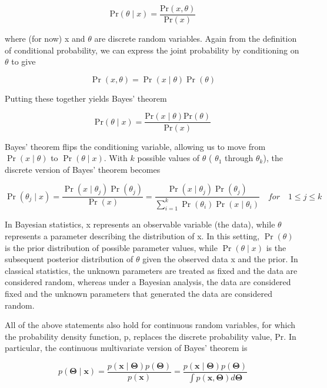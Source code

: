 \documentclass{article}
\begin{document}
\begin{equation}
\mathrm{Pr}(\theta\mid x)=\frac{\mathrm{Pr}(x,\theta)}{\mathrm{Pr}(x)}
\end{equation}

where (for now) x and  $ \theta $ are discrete random variables. Again from the definition of conditional probability, we can express the joint probability by conditioning on  $ \theta $ to give

\begin{equation}
\Pr(x,\theta)=\Pr(x\mid\theta)\Pr(\theta)
\end{equation}

Putting these together yields Bayes' theorem

\begin{equation}
\mathrm{Pr}(\theta\mid x)=\frac{\mathrm{Pr}(x\mid\theta)\mathrm{Pr}(\theta)}{\mathrm{Pr}(x)}
\end{equation}

Bayes' theorem flips the conditioning variable, allowing us to move from  $ \Pr(x \mid \theta) $ to  $ \Pr(\theta \mid x) $. With  $ k $ possible values of  $ \theta $ ( $ \theta_1 $ through  $ \theta_k $), the discrete version of Bayes' theorem becomes

\begin{equation}
\Pr(\theta_{j}\mid x)=\frac{\Pr(x\mid\theta_{j})\Pr(\theta_{j})}{\Pr(x)}=\frac{\Pr(x\mid\theta_{j})\Pr(\theta_{j})}{\displaystyle\sum_{i=1}^{k}\Pr(\theta_{i})\Pr(x\mid\theta_{i})}\quad for\quad1\leq j\leq k
\end{equation}

In Bayesian statistics, x represents an observable variable (the data), while  $ \theta $ represents a parameter describing the distribution of x. In this setting,  $ \Pr(\theta) $ is the prior distribution of possible parameter values, while  $ \Pr(\theta \mid x) $ is the subsequent posterior distribution of  $ \theta $ given the observed data x and the prior. In classical statistics, the unknown parameters are treated as fixed and the data are considered random, whereas under a Bayesian analysis, the data are considered fixed and the unknown parameters that generated the data are considered random.

All of the above statements also hold for continuous random variables, for which the probability density function, p, replaces the discrete probability value, Pr. In particular, the continuous multivariate version of Bayes' theorem is

\begin{equation}
p(\boldsymbol{\Theta}\mid\mathbf{x})=\frac{p(\mathbf{x}\mid\boldsymbol{\Theta})p(\boldsymbol{\Theta})}{p(\mathbf{x})}=\frac{p(\mathbf{x}\mid\boldsymbol{\Theta})p(\boldsymbol{\Theta})}{\int p(\mathbf{x},\boldsymbol{\Theta})d\boldsymbol{\Theta}}
\end{equation}
\end{document}
